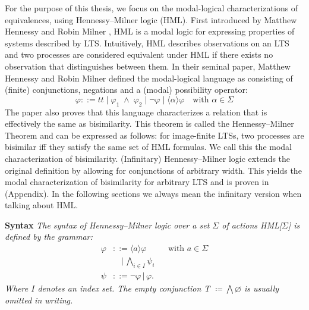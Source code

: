 %
\begin{isabellebody}%
%
%
\isadelimtheory
%
\endisadelimtheory
%
\isatagtheory
%
\endisatagtheory
{\isafoldtheory}%
%
\isadelimtheory
%
\endisadelimtheory
%
\isadelimdocument
%
\endisadelimdocument
%
\isatagdocument
%
\isamarkuptrue%
%
\endisatagdocument
{\isafolddocument}%
%
\isadelimdocument
%
\endisadelimdocument
%
\begin{isamarkuptext}%
For the purpose of this thesis, we focus on the modal-logical characterizations of equivalences, using Hennessy--Milner logic (HML). 
First introduced by Matthew Hennessy and Robin Milner \cite{hm85}, HML is a modal logic for expressing properties of systems described by LTS.
Intuitively, HML describes observations on an LTS and two processes are considered equivalent under HML if there exists no observation that distinguishes between them.
In their seminal paper, Matthew Hennessy and Robin Milner defined the modal-logical language as consisting of (finite) conjunctions, negations and a (modal) possibility operator:
$$\varphi ::= t\!t \mid \varphi_1 \;\wedge\; \varphi_2 \mid \neg\varphi \mid \langle\alpha\rangle\varphi \quad\text{with }\alpha\in\Sigma$$
The paper also proves that this language characterizes a relation that is effectively the same as bisimilarity. 
This theorem is called the Hennessy--Milner Theorem and can be expressed as follows: for image-finite LTSs, two processes are bisimilar iff they satisfy the same set of HML formulas. We call this the modal characterization of
bisimilarity. (Infinitary) Hennessy--Milner logic extends the original definition by allowing for conjunctions of arbitrary width. 
This yields the modal characterization of bisimilarity for arbitrary LTS and is proven in (Appendix). In the following sections we always mean the infinitary version when talking about HML.%
\end{isamarkuptext}\isamarkuptrue%
%
\isadelimdocument
%
\endisadelimdocument
%
\isatagdocument
%
\isamarkuptrue%
%
\endisatagdocument
{\isafolddocument}%
%
\isadelimdocument
%
\endisadelimdocument
%
\begin{isamarkuptext}%
\textbf{Syntax} \textit{The \textnormal{syntax of Hennessy--Milner logic} over a set $\Sigma$ of actions HML[$\Sigma$] is defined by the grammar:
\begin{align*}
    \varphi &::= \langle a \rangle \varphi && \text{with } a \in \Sigma \\
            &\quad | \, \bigwedge_{i \in I} \psi_i \\
    \psi &::= \neg \varphi \, | \, \varphi.
\end{align*}
Where $I$ denotes an index set. The empty conjunction \textsf{T} $\coloneqq \bigwedge\varnothing$ is usually omitted in writing.}


\end{isamarkuptext}
\end{isabellebody}
